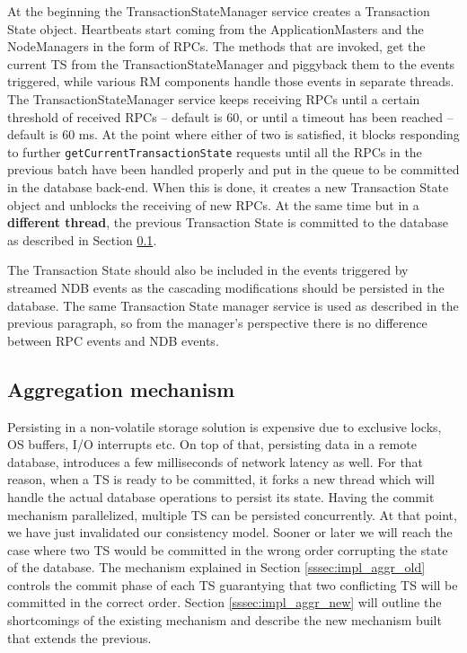 At the beginning the TransactionStateManager service creates a
Transaction State object. Heartbeats start coming from the
ApplicationMasters and the NodeManagers in the form of RPCs. The
methods that are invoked, get the current TS from the
TransactionStateManager and piggyback them to the events
triggered, while various RM components handle those events in separate
threads.
The TransactionStateManager service keeps receiving RPCs
until a certain threshold of received RPCs -- default is 60, or until
a timeout has been reached -- default is 60 ms. At the point where
either of two is satisfied, it blocks responding to further
\texttt{getCurrentTransactionState} requests until all the RPCs in the
previous batch have been handled properly and put in the queue to be
committed in the database back-end. When this is done, it
creates a new Transaction State object and unblocks the receiving of
new RPCs. At the same time but in a \textbf{different thread}, the previous
Transaction State is committed to the database as described in Section
\ref{ssec:impl_aggr_mechanism}.

The Transaction State should also be included in the
events triggered by streamed NDB events as the cascading modifications
should be persisted in the database. The same Transaction State
manager service is used as described in the previous paragraph,
so from the manager's perspective there is no difference between
RPC events and NDB events.

\subsection{Aggregation mechanism}
\label{ssec:impl_aggr_mechanism}
Persisting in a non-volatile storage solution is expensive due to
exclusive locks, OS buffers, I/O interrupts etc. On top of that,
persisting data in a remote database, introduces a
few milliseconds of network latency as well. For that reason,
when a TS is ready to be committed, it forks
a new thread which will handle the actual database operations to
persist its state. Having the commit mechanism parallelized, multiple
TS can be persisted concurrently. At that point, we have just
invalidated our consistency model. Sooner or later we will
reach the case where two TS would be committed in the wrong order
corrupting the state of the database. The mechanism explained in
Section \ref{sssec:impl_aggr_old} controls the commit phase of each TS
guarantying that two conflicting TS will be committed in the correct
order. Section \ref{sssec:impl_aggr_new} will outline the
shortcomings of the existing mechanism and describe the new mechanism
built that extends the previous.

